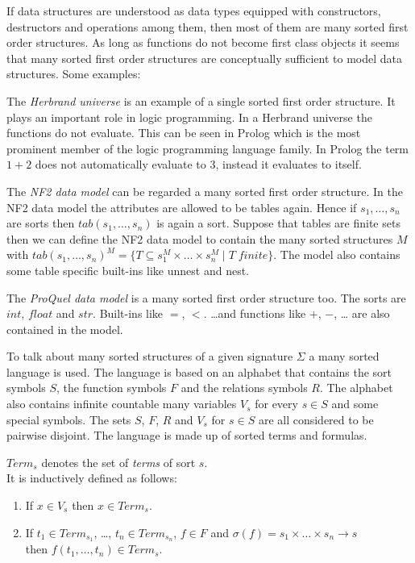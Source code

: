 If data structures are understood as data types equipped with constructors, destructors and
operations among them, then most of them are many sorted first order structures. As long
as functions do not become first class objects it seems that many sorted first order structures
are conceptually sufficient to model data structures. Some examples:

\begin{Bsp} The {\em Herbrand universe} is an example of a single sorted first order structure. 
It plays an important role in logic programming. In a Herbrand universe the functions do not 
evaluate. This can be seen in Prolog which is the most prominent member of the logic programming 
language family. In Prolog the term $1+2$ does not automatically evaluate to $3$, instead it
evaluates to itself.
\end{Bsp}

\begin{Bsp} The {\em NF2 data model} can be regarded a many sorted first order structure. In the NF2 
data model the attributes are allowed to be tables again. Hence if $s_1,\ldots,s_n$ are sorts then
$tab(s_1,\ldots,s_n)$ is again a sort. Suppose that tables are finite sets then we can define the
NF2 data model to contain the many sorted structures $M$ with $tab(s_1,\ldots,s_n)^M = \{T \subseteq 
s_1^M \times \ldots \times s_n^M\; | \; T\;finite \}$. The model also contains some table specific
built-ins like unnest and nest.
\end{Bsp}

\begin{Bsp} The {\em ProQuel data model} is a many sorted first order structure too. The sorts
are $int$, $float$ and $str$. Built-ins like $=$, $<$. \ldots and functions like $+$, $-$, \ldots
are also contained in the model.
\end{Bsp}

To talk about many sorted structures of a given signature $\Sigma$ a many sorted language is 
used. The language is based on an alphabet that contains the sort symbols $S$, the function 
symbols $F$ and the relations symbols $R$. The alphabet also contains infinite countable
many variables $V_s$ for every $s \in S$ and some special symbols. The sets $S$, $F$, $R$ and
$V_s$ for $s\in S$ are all considered to be pairwise disjoint. The language is made up 
of sorted terms and formulas.

\begin{Def} $Term_s$ denotes the set of {\em terms} of sort $s$. \\
It is inductively defined as follows:
\begin{enumerate}
\item If $x \in V_s$ then $x \in Term_s$. 
\item If $t_1 \in Term_{s_1}$, \ldots, $t_n \in Term_{s_n}$, $f \in F$ and 
$\sigma(f)=s_1 \times \ldots \times s_n \rightarrow s$ \\
then $f(t_1, \ldots, t_n) \in Term_s$.
\end{enumerate}
\end{Def}

